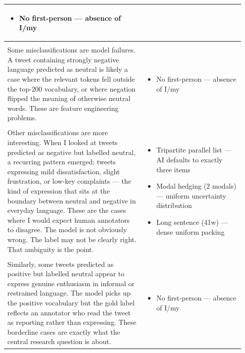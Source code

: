 \documentclass[11pt]{article}
\begin{document}
\begin{longtable}{|p{0.55\linewidth}|p{0.40\linewidth}|}
\begin{itemize}[leftmargin=1em,itemsep=1pt,topsep=1pt,parsep=0pt]
  \item No first-person --- absence of I/my
\end{itemize} \\[2pt]
\hline
\rule{0pt}{3.5cm} & \\
\hline
Some misclassifications are model failures. A tweet containing strongly negative language predicted as neutral is likely a case where the relevant tokens fell outside the top-200 vocabulary, or where negation flipped the meaning of otherwise neutral words. These are feature engineering problems. & \begin{itemize}[leftmargin=1em,itemsep=1pt,topsep=1pt,parsep=0pt]
  \item No first-person --- absence of I/my
\end{itemize} \\[2pt]
\hline
\rule{0pt}{3.5cm} & \\
\hline
Other misclassifications are more interesting. When I looked at tweets predicted as negative but labelled neutral, a recurring pattern emerged: tweets expressing mild dissatisfaction, slight frustration, or low-key complaints --- the kind of expression that sits at the boundary between neutral and negative in everyday language. These are the cases where I would expect human annotators to disagree. The model is not obviously wrong. The label may not be clearly right. That ambiguity is the point. & \begin{itemize}[leftmargin=1em,itemsep=1pt,topsep=1pt,parsep=0pt]
  \item Tripartite parallel list --- AI defaults to exactly three items
  \item Modal hedging (2 modals) --- uniform uncertainty distribution
  \item Long sentence (41w) --- dense uniform packing
\end{itemize} \\[2pt]
\hline
\rule{0pt}{3.5cm} & \\
\hline
Similarly, some tweets predicted as positive but labelled neutral appear to express genuine enthusiasm in informal or restrained language. The model picks up the positive vocabulary but the gold label reflects an annotator who read the tweet as reporting rather than expressing. These borderline cases are exactly what the central research question is about. & \begin{itemize}[leftmargin=1em,itemsep=1pt,topsep=1pt,parsep=0pt]
  \item No first-person --- absence of I/my
\end{itemize} \\[2pt]

\end{longtable}
\end{document}
